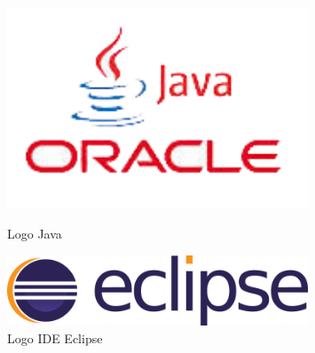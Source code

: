 \documentclass[twoside,12pt]{report}
\begin{document}
\begin{figure}[h]
\begin{flushleft}
	\begin{minipage}[]{.47\textwidth}
	\centering
	\includegraphics[width=0.8\textwidth]{img/java}
	\caption{Logo Java\cite{java}}
\end{minipage}%
\end{flushleft}
\begin{flushright}
	\begin{minipage}[]{.47\textwidth}
	\centering
	\includegraphics[width=0.8\textwidth]{img/eclipse}
	\caption{Logo IDE Eclipse\cite{eclipse}}	
	\end{minipage}
\end{flushright}
\end{figure}
\end{document}
